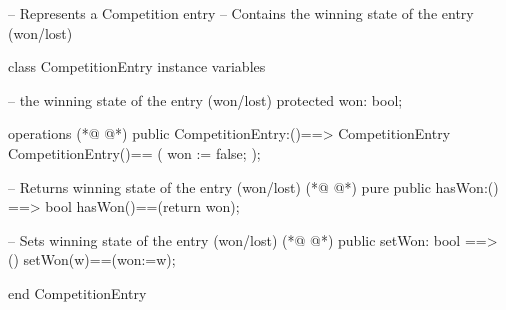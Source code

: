 \begin{vdmpp}[breaklines=true]
-- Represents a Competition entry
-- Contains the winning state of the entry (won/lost) 

class CompetitionEntry
instance variables

  -- the winning state of the entry (won/lost) 
  protected won: bool;
  
operations
(*@
\label{CompetitionEntry:11}
@*)
  public CompetitionEntry:()==> CompetitionEntry
  CompetitionEntry()== 
  (
    won := false;
  );
  
  -- Returns winning state of the entry (won/lost)
(*@
\label{hasWon:18}
@*)
  pure public hasWon:() ==> bool
    hasWon()==(return won);

   -- Sets winning state of the entry (won/lost)
(*@
\label{setWon:22}
@*)
   public setWon: bool ==> ()
   setWon(w)==(won:=w);
  
   
end CompetitionEntry
\end{vdmpp}
